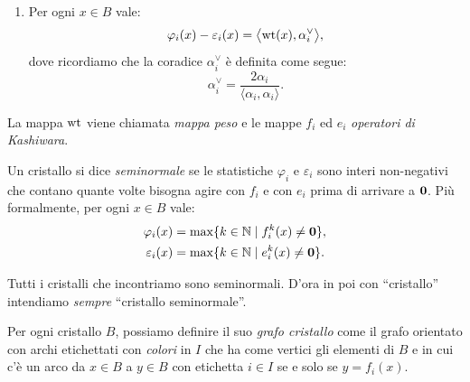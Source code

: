 \begin{definition}
\begin{enumerate}[label=(A\arabic*)]
\begin{align*}
                \varepsilon_i (e_i (x)) &= \varepsilon_i(x) -1,
                                        && \text{se $e_i(x) \neq \zero$.}
            \end{align*}
        \item \label{item:axiom_4}
            Per ogni $x \in B$ vale:
            \[
                \varphi_i(x) - \varepsilon_i(x) = 
                \bigl\langle \operatorname{wt}(x), \alpha_i^\vee \bigr\rangle,
            \]
            dove ricordiamo che la coradice $\alpha_i^\vee$ \`e definita come segue:
            \[
                \alpha_i^\vee = \frac{2 \alpha_i}{ \langle \alpha_i, \alpha_i \rangle }.
        \]
    \end{enumerate}

    La mappa $\operatorname{wt}$ viene chiamata \emph{mappa peso} e le mappe
    $f_i$ ed $e_i$  \emph{operatori di Kashiwara}.

\end{definition}

\begin{definition}
    \label{def:crys_seminormal}
    Un cristallo si dice \emph{seminormale} se le statistiche $\varphi_i$ e 
    $\varepsilon_i$ sono interi non-negativi che contano quante volte 
    bisogna agire con $f_i$ e con $e_i$ prima di arrivare a $\mathbf{0}$.
    Pi\`u formalmente, per ogni $x \in B$ vale:
    \begin{subequations}
        \label{eq:def_crys_seminormal}
        \begin{align}
            \label{subeq:seminorm_phi}
            \varphi_i (x) &= \max \{ k \in \mathbb{N} \mid f_i^k(x) \neq \mathbf{0} \} , \\
            \label{subeq:seminorm_epsilon}
            \varepsilon_i (x) &= \max \{ k \in \mathbb{N} \mid e_i^k(x) \neq \mathbf{0} \}.
        \end{align}
    \end{subequations}
\end{definition}

Tutti i cristalli che incontriamo sono seminormali. D'ora in poi
con ``cristallo'' intendiamo \emph{sempre} ``cristallo seminormale''.



\begin{definition}
    Per ogni cristallo $B$, possiamo definire il suo \emph{grafo cristallo} come il grafo
    orientato con archi etichettati con \emph{colori} in $I$ che ha come vertici gli elementi di 
    $B$ e in cui c'\`e un arco da $x \in B$ a $y \in B$ con etichetta $i \in I$ 
    se e solo se $y = f_i (x)$.
\end{definition}

